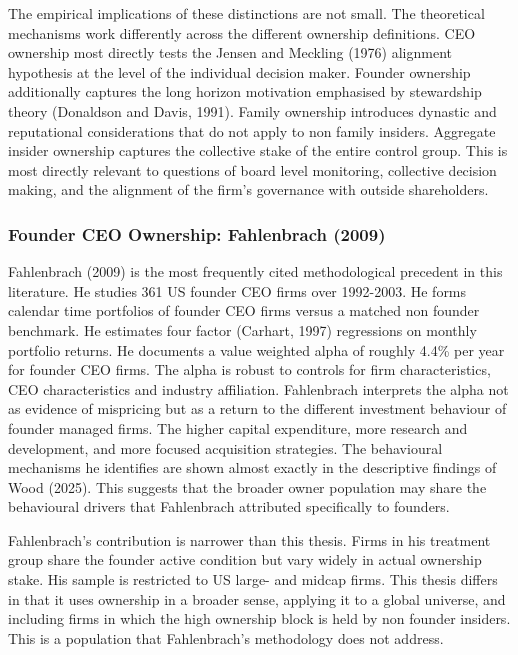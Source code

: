 The empirical implications of these distinctions are not small. The theoretical mechanisms work differently across the different ownership definitions. CEO ownership most directly tests the Jensen and Meckling (1976) alignment hypothesis at the level of the individual decision maker. Founder ownership additionally captures the long horizon motivation emphasised by stewardship theory (Donaldson and Davis, 1991). Family ownership introduces dynastic and reputational considerations that do not apply to non family insiders. Aggregate insider ownership captures the collective stake of the entire control group. This is most directly relevant to questions of board level monitoring, collective decision making, and the alignment of the firm's governance with outside shareholders.


\subsubsection{Founder CEO Ownership: Fahlenbrach (2009)}

Fahlenbrach (2009) is the most frequently cited methodological precedent in this literature. He studies 361 US founder CEO firms over 1992-2003. He forms calendar time portfolios of founder CEO firms versus a matched non founder benchmark. He estimates four factor (Carhart, 1997) regressions on monthly portfolio returns. He documents a value weighted alpha of roughly 4.4\% per year for founder CEO firms. The alpha is robust to controls for firm characteristics, CEO characteristics and industry affiliation. Fahlenbrach interprets the alpha not as evidence of mispricing but as a return to the different investment behaviour of founder managed firms. The higher capital expenditure, more research and development, and more focused acquisition strategies. The behavioural mechanisms he identifies are shown almost exactly in the descriptive findings of Wood (2025). This suggests that the broader owner population may share the behavioural drivers that Fahlenbrach attributed specifically to founders.

Fahlenbrach's contribution is narrower than this thesis. Firms in his treatment group share the founder active condition but vary widely in actual ownership stake. His sample is restricted to US large- and midcap firms. This thesis differs in that it uses ownership in a broader sense, applying it to a global universe, and including firms in which the high ownership block is held by non founder insiders. This is a population that Fahlenbrach's methodology does not address.


